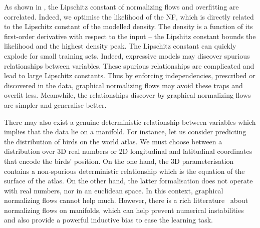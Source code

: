 As shown in , the Lipschitz constant of normalizing flows and overfitting are correlated. Indeed, we optimise the likelihood of the NF, which is directly related to the Lipschitz constant of the modelled density. The density is a function of its first-order derivative with respect to the input -- the Lipshitz constant bounds the likelihood and the highest density peak. The Lipschitz constant can quickly explode for small training sets. Indeed, expressive models may discover spurious relationships between variables. These spurious relationships are complicated and lead to large Lipschitz constants. Thus by enforcing independencies, prescribed or discovered in the data, graphical normalizing flows may avoid these traps and overfit less. Meanwhile, the relationships discover by graphical normalizing flows are simpler and generalise better.

There may also exist a genuine deterministic relationship between variables which implies that the data lie on a manifold. For instance, let us consider predicting the distribution of birds on the world atlas. We must choose between a distribution over 3D real numbers or 2D longitudinal and latitudinal coordinates that encode the birds' position. On the one hand, the 3D parameterisation contains a non-spurious deterministic relationship which is the equation of the surface of the atlas. On the other hand, the latter formalisation does not operate with real numbers, nor in an euclidean space. In this context, graphical normalizing flows cannot help much. However, there is a rich litterature~\citep{kohler2021smooth, mathieu2020riemannian, gemici2016normalizing, kalatzis2021multi, rezende2020normalizing} about normalizing flows on manifolds, which can help prevent numerical instabilities and also provide a powerful inductive bias to ease the learning task.

